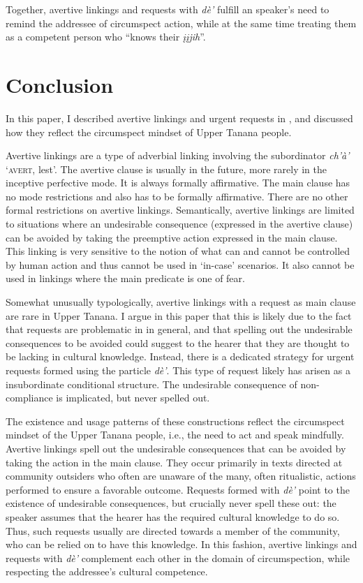 \documentclass[output=paper,colorlinks,citecolor=brown]{langscibook}
\begin{document}
Together, avertive linkings and requests with \textit{dè'} fulfill an  speaker's need to remind the addressee of circumspect action, while at the same time treating them as a competent person who ``knows their \textit{įįjih}''. 



\section{Conclusion}
\label{section:conclusion}

In this paper, I described avertive linkings and urgent requests in , and discussed how they reflect the circumspect mindset of Upper Tanana people. 

Avertive linkings are a type of adverbial linking involving the subordinator \textit{ch'à'} `\textsc{avert}, lest'. The avertive clause is usually in the future, more rarely in the inceptive perfective mode. It is always formally affirmative. The main clause has no mode restrictions and also has to be formally affirmative. There are no other formal restrictions on avertive linkings. Semantically, avertive linkings are limited to situations where an undesirable consequence (expressed in the avertive clause) can be avoided by taking the preemptive action expressed in the main clause. This linking is very sensitive to the notion of what can and cannot be controlled by human action and thus cannot be used in `in-case' scenarios. It also cannot be used in linkings where the main predicate is one of fear. 

Somewhat unusually typologically, avertive linkings with a request as main clause are rare in Upper Tanana. I argue in this paper that this is likely due to the fact that requests are problematic in  in general, and that spelling out the undesirable consequences to be avoided could suggest to the hearer that they are thought to be lacking in cultural knowledge. Instead, there is a dedicated strategy for urgent requests formed using the particle \textit{dè'}. This type of request likely has arisen as a insubordinate conditional structure. The undesirable consequence of non-compliance is implicated, but never spelled out.

The existence and usage patterns of these constructions reflect the circumspect mindset of the Upper Tanana people, i.e., the need to act and speak mindfully. Avertive linkings spell out the undesirable consequences that can be avoided by taking the action in the main clause. They occur primarily in texts directed at community outsiders who often are unaware of the many, often ritualistic, actions performed to ensure a favorable outcome. Requests formed with \textit{dè'} point to the existence of undesirable consequences, but crucially never spell these out: the speaker assumes that the hearer has the required cultural knowledge to do so. Thus, such requests usually are directed towards a member of the community, who can be relied on to have this knowledge. In this fashion, avertive linkings and requests with \textit{dè'} complement each other in the domain of circumspection, while respecting the addressee's cultural competence.
\end{document}

